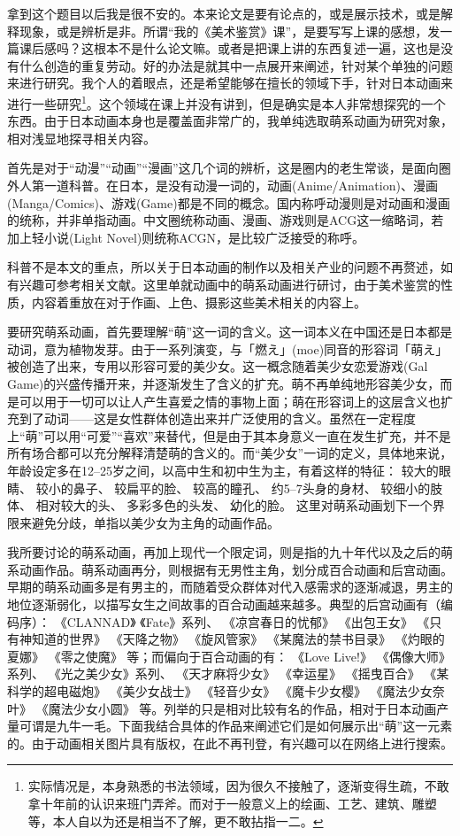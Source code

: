 \documentclass[cs5size,b5paper,nofonts]{ctexart}
\def\titlee{我的《美术鉴赏》课}
\begin{document}
\begin{multicols}{2}

拿到这个题目以后我是很不安的。本来论文是要有论点的，或是展示技术，或是解释现象，或是辨析是非。所谓“\titlee ”，是要写写上课的感想，发一篇课后感吗？这根本不是什么论文嘛。或者是把课上讲的东西复述一遍，这也是没有什么创造的重复劳动。好的办法是就其中一点展开来阐述，针对某个单独的问题来进行研究。我个人的着眼点，还是希望能够在擅长的领域下手，针对日本动画来进行一些研究\footnote{实际情况是，本身熟悉的书法领域，因为很久不接触了，逐渐变得生疏，不敢拿十年前的认识来班门弄斧。而对于一般意义上的绘画、工艺、建筑、雕塑等，本人自以为还是相当不了解，更不敢拈指一二。}。这个领域在课上并没有讲到，但是确实是本人非常想探究的一个东西。由于日本动画本身也是覆盖面非常广的，我单纯选取萌系动画为研究对象，相对浅显地探寻相关内容。

\bigskip

首先是对于“动漫”“动画”“漫画”这几个词的辨析，这是圈内的老生常谈，是面向圈外人第一道科普。在日本，是没有动漫一词的，动画(Anime/Animation)、漫画(Manga/Comics)、游戏(Game)都是不同的概念。国内称呼动漫则是对动画和漫画的统称，并非单指动画。中文圈统称动画、漫画、游戏则是ACG这一缩略词，若加上轻小说(Light Novel)则统称ACGN，是比较广泛接受的称呼。

科普不是本文的重点，所以关于日本动画的制作以及相关产业的问题不再赘述，如有兴趣可参考相关文献。这里单就动画中的萌系动画进行研讨，由于美术鉴赏的性质，内容着重放在对于作画、上色、摄影这些美术相关的内容上。

\pagebreak

要研究萌系动画，首先要理解“萌”这一词的含义。这一词本义在中国还是日本都是动词，意为植物发芽。由于一系列演变，与{\ja 「燃え」}(moe)同音的形容词{\ja 「萌え」}被创造了出来，专用以形容可爱的美少女。这一概念随着美少女恋爱游戏(Gal Game)的兴盛传播开来，并逐渐发生了含义的扩充。萌不再单纯地形容美少女，而是可以用于一切可以让人产生喜爱之情的事物上面；萌在形容词上的这层含义也扩充到了动词——这是女性群体创造出来并广泛使用的含义。虽然在一定程度上“萌”可以用“可爱”“喜欢”来替代，但是由于其本身意义一直在发生扩充，并不是所有场合都可以充分解释清楚萌的含义的。而“美少女”一词的定义，具体地来说，年龄设定多在12--25岁之间，以高中生和初中生为主，有着这样的特征：
较大的眼睛、
较小的鼻子、
较扁平的脸、
较高的瞳孔、
约5--7头身的身材、
较细小的肢体、
相对较大的头、
多彩多色的头发、
幼化的脸。
这里对萌系动画划下一个界限来避免分歧，单指以美少女为主角的动画作品。

我所要讨论的萌系动画，再加上现代一个限定词，则是指的九十年代以及之后的萌系动画作品。萌系动画再分，则根据有无男性主角，划分成百合动画和后宫动画。早期的萌系动画多是有男主的，而随着受众群体对代入感需求的逐渐减退，男主的地位逐渐弱化，以描写女生之间故事的百合动画越来越多。典型的后宫动画有（编码序）：
《CLANNAD》
《Fate》系列、
《凉宫春日的忧郁》
《出包王女》
《只有神知道的世界》
《天降之物》
《旋风管家》
《某魔法的禁书目录》
《灼眼的夏娜》
《零之使魔》
等；而偏向于百合动画的有：
《Love Live!》
《偶像大师》系列、
《光之美少女》系列、
《天才麻将少女》
《幸运星》
《摇曳百合》
《某科学的超电磁炮》
《美少女战士》
《轻音少女》
《魔卡少女樱》
《魔法少女奈叶》
《魔法少女小圆》
等。列举的只是相对比较有名的作品，相对于日本动画产量可谓是九牛一毛。下面我结合具体的作品来阐述它们是如何展示出“萌”这一元素的。由于动画相关图片具有版权，在此不再刊登，有兴趣可以在网络上进行搜索。


\end{multicols}
\end{document}
